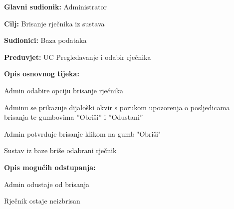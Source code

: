 \noindent {}
\begin{packed_item}

	\item \textbf{Glavni sudionik:} Administrator
	\item  \textbf{Cilj:} Brisanje rječnika iz sustava
	\item  \textbf{Sudionici:} Baza podataka
	\item  \textbf{Preduvjet:} UC Pregledavanje i odabir rječnika
	\item  \textbf{Opis osnovnog tijeka:}
	
	\item[] \begin{packed_enum}

		\item Admin odabire opciju brisanje rječnika
		\item Adminu se prikazuje dijaloški okvir s porukom upozorenja o posljedicama brisanja te gumbovima ”Obriši” i ”Odustani”
		\item Admin potvrđuje brisanje klikom na gumb "Obriši"
		\item Sustav iz baze briše odabrani rječnik
		
	\end{packed_enum}

	\item  \textbf{Opis mogućih odstupanja:}
	
	\item[] \begin{packed_item}

		\item[3.a] Admin odustaje od brisanja
		\item[] \begin{packed_enum}
			
			\item Rječnik ostaje neizbrisan
			
		\end{packed_enum}
		
	\end{packed_item}

\end{packed_item}

